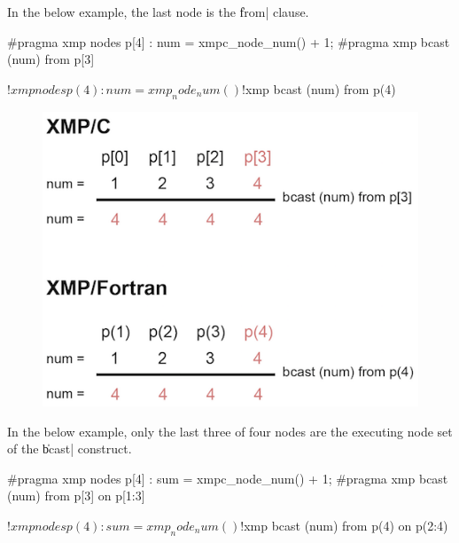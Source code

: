In the below example, the last node is the \|from| clause.

\begin{XCexample}
#pragma xmp nodes p[4]
  :
num = xmpc_node_num() + 1;
#pragma xmp bcast (num) from p[3]
\end{XCexample}

\begin{XFexample}
!$xmp nodes p(4)
  :
num = xmp_node_num()
!$xmp bcast (num) from p(4)
\end{XFexample}

\begin{figure}
  \centering
  \includegraphics{figs/bcast_from.png}
\end{figure}

In the below example, only the last three of four nodes
are the executing node set of the \|bcast| construct.

\begin{XCexample}
#pragma xmp nodes p[4]
  :
sum = xmpc_node_num() + 1;
#pragma xmp bcast (num) from p[3] on p[1:3]
\end{XCexample}

\begin{XFexample}
!$xmp nodes p(4)
  :
 sum = xmp_node_num()
 !$xmp bcast (num) from p(4) on p(2:4)
\end{XFexample}

